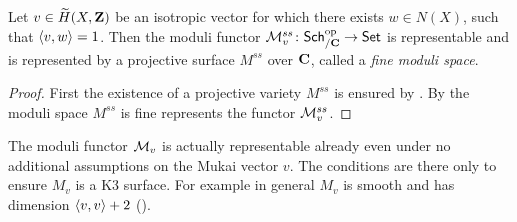 \begin{theorem}
    \label{Representability of moduli functor}
    Let $v \in \widetilde{H}(X, \mathbf Z)$ be an isotropic vector for which there exists $w \in N(X)$, such that $\langle v, w \rangle = 1$. Then the moduli functor $\mathcal M^{ss}_v \colon \mathsf{Sch}_{/\mathbf C}^{\text{op}} \to \mathsf{Set}$ is representable and is represented by a projective surface $M^{ss}$ over $\mathbf C$, called a \emph{fine moduli space}. 
\end{theorem}

\begin{proof}
    First the existence of a projective variety $M^{ss}$ is ensured by \cite[\S 10, Theorem 10.18]{huybrechts2006fouriermukai}. By \cite[\S 10, Corollary 10.23]{huybrechts2006fouriermukai} the moduli space $M^{ss}$ is fine \ie represents the functor $\mathcal M_v^{ss}$.
\end{proof}

\begin{remark}
    
\end{remark}



\begin{remark}
    The moduli functor $\mathcal M_v$ is actually representable already even under no additional assumptions on the Mukai vector $v$. The conditions are there only to ensure $M_v$ is a K3 surface. For example in general $M_v$ is smooth and has dimension $\langle v, v \rangle + 2$ (\cf \cite[\S 4.3, Propositon 4.20]{vanBree2020}).
\end{remark}

